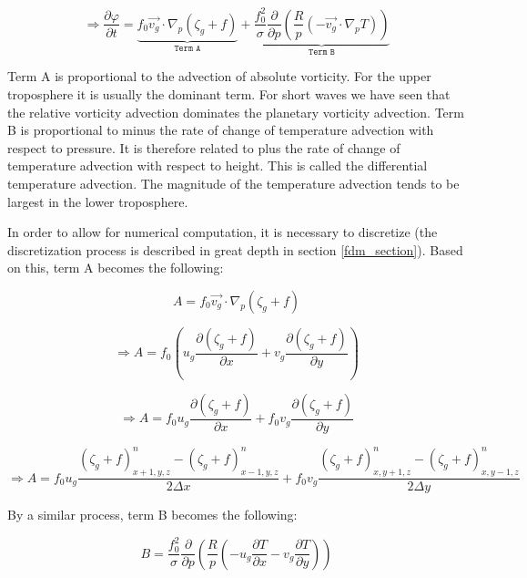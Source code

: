 \begin{equation}
    \Rightarrow \frac{\partial \varphi}{\partial t} = \underbrace{f_0 \Vec{v_g} \cdot \nabla_p (\zeta_g + f)}_{\texttt{Term A}} + \underbrace{\frac{f^2_0}{\sigma} \frac{\partial}{\partial p} (\frac{R}{p} (-\Vec{v_g} \cdot \nabla_p T))}_{\texttt{Term B}}
    \label{complex_qg_proportional}
\end{equation}

Term A is proportional to the advection of absolute vorticity. For the upper troposphere it is usually the dominant term.
For short waves we have seen that the relative vorticity advection dominates the planetary vorticity advection. Term B is proportional to minus
the rate of change of temperature advection with respect to pressure. It is therefore related to plus the rate of change of temperature advection with respect to height. This is called the differential temperature advection. The magnitude of the temperature advection tends to be largest in the lower troposphere\cite{describe_quasi}.

In order to allow for numerical computation, it is necessary to discretize (the discretization process is described in great depth in section \ref{fdm_section}). Based on this, term A becomes the following:

\begin{equation}
    A = f_0 \Vec{v_g} \cdot \nabla_p (\zeta_g + f)
\end{equation}

\begin{equation}
    \Rightarrow A = f_0 (u_g \frac{\partial (\zeta_g + f)}{\partial x} + v_g \frac{\partial (\zeta_g + f)}{\partial y})
\end{equation}

\begin{equation}
    \Rightarrow A = f_0 u_g \frac{\partial (\zeta_g + f)}{\partial x} + f_0 v_g \frac{\partial (\zeta_g + f)}{\partial y}
\end{equation}

\begin{equation}
    \Rightarrow A = f_0 u_g \frac{(\zeta_g + f)^{n}_{x+1, y, z} - (\zeta_g + f)^{n}_{x-1, y, z}}{2 \Delta x} + f_0 v_g \frac{(\zeta_g + f)^{n}_{x, y+1, z} - (\zeta_g + f)^{n}_{x, y-1, z}}{2 \Delta y}
\end{equation}

By a similar process, term B becomes the following:

\begin{equation}
    B = \frac{f^2_0}{\sigma} \frac{\partial}{\partial p} (\frac{R}{p} (-u_g \frac{\partial T}{\partial x} - v_g \frac{\partial T}{\partial y}))
\end{equation}

